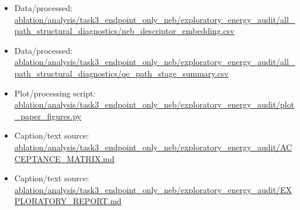 \begin{itemize}[leftmargin=1.4em,noitemsep]
\item Data/processed: \begingroup\scriptsize\url{ablation/analysis/task3_endpoint_only_neb/exploratory_energy_audit/all_path_structural_diagnostics/neb_descriptor_embedding.csv}\endgroup
\item Data/processed: \begingroup\scriptsize\url{ablation/analysis/task3_endpoint_only_neb/exploratory_energy_audit/all_path_structural_diagnostics/qe_path_stage_summary.csv}\endgroup
\item Plot/processing script: \begingroup\scriptsize\url{ablation/analysis/task3_endpoint_only_neb/exploratory_energy_audit/plot_paper_figures.py}\endgroup
\item Caption/text source: \begingroup\scriptsize\url{ablation/analysis/task3_endpoint_only_neb/exploratory_energy_audit/ACCEPTANCE_MATRIX.md}\endgroup
\item Caption/text source: \begingroup\scriptsize\url{ablation/analysis/task3_endpoint_only_neb/exploratory_energy_audit/EXPLORATORY_REPORT.md}\endgroup
\end{itemize}
